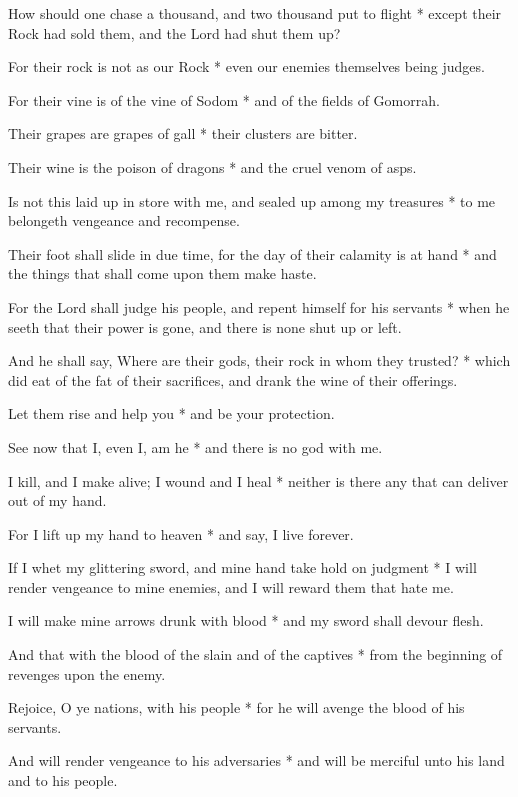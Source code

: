 How should one chase a thousand, and two thousand put to flight * except their Rock had sold them, and the Lord had shut them up?

For their rock is not as our Rock * even our enemies themselves being judges.

For their vine is of the vine of Sodom * and of the fields of Gomorrah.

Their grapes are grapes of gall * their clusters are bitter.

Their wine is the poison of dragons * and the cruel venom of asps.

Is not this laid up in store with me, and sealed up among my treasures *  to me belongeth vengeance and recompense.

Their foot shall slide in due time, for the day of their calamity is at hand * and the things that shall come upon them make haste.

For the Lord shall judge his people, and repent himself for his servants * when he seeth that their power is gone, and there is none shut up or left.

And he shall say, Where are their gods, their rock in whom they trusted? * which did eat of the fat of their sacrifices, and drank the wine of their offerings.

Let them rise and help you * and be your protection.

See now that I, even I, am he * and there is no god with me.

I kill, and I make alive; I wound and I heal * neither is there any that can deliver out of my hand.

For I lift up my hand to heaven * and say, I live forever.

If I whet my glittering sword, and mine hand take hold on judgment * I will render vengeance to mine enemies, and I will reward them that hate me.

I will make mine arrows drunk with blood * and my sword shall devour flesh.

And that with the blood of the slain and of the captives * from the beginning of revenges upon the enemy.

Rejoice, O ye nations, with his people * for he will avenge the blood of his servants.

And will render vengeance to his adversaries * and will be merciful unto his land and to his people.